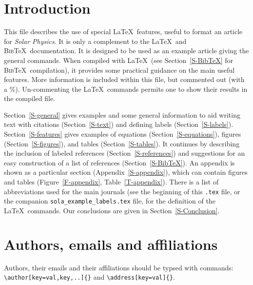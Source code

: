 \documentclass[namedreferences]{solarphysics}
\newcommand{\BibTeX}{\textsc{Bib}\TeX}
\begin{document}
\begin{article}
\section{Introduction}
     \label{S-Introduction} 

This file describes the use of special \LaTeX\ features,
useful to format an article for {\it Solar Physics}.  It is only a complement
to the \LaTeX\ and \BibTeX\ documentation.  
It is designed to be used as an example
article giving the general commands. When compiled with \LaTeX\ 
(see Section~\ref{S-BibTeX} for \BibTeX\ compilation), it provides
some practical guidance on the main useful features. More information
is included within this file, but commented out (with a \%).
Un-commenting the \LaTeX\ commands permits one to show their 
results in the compiled file.   
    
 Section~\ref{S-general} gives examples and some general information
to aid writing text with citations (Section~\ref{S-text})
and defining labels (Section~\ref{S-labels}).
Section~\ref{S-features} gives examples of equations 
(Section~\ref{S-equations}), figures (Section~\ref{S-figures}), and 
tables (Section~\ref{S-tables}).
It continues by describing the inclusion of labeled references
(Section~\ref{S-references}) and suggestions for an easy construction 
of a list of references (Section~\ref{S-BibTeX}). 
An appendix is shown as a particular section (Appendix~\ref{S-appendix}),
which can contain figures and tables (Figure~\ref{F-appendix}, 
Table~\ref{T-appendix}).
There is a list of abbreviations used for the main journals (see the
beginning of this \texttt{.tex} file, or the companion 
 \verb+sola_example_labels.tex+ 
file, for the definition of the \LaTeX\ commands.
Our conclusions are given in Section~\ref{S-Conclusion}. 

\section{Authors, emails and affiliations}
\label{S-aug}
Authors, their emails and their affiliations should be typsed with commands: 
\verb+\author[key=val,key,..]{}+ and \verb+\address[key=val]{}+.


\end{article}
\end{document}

